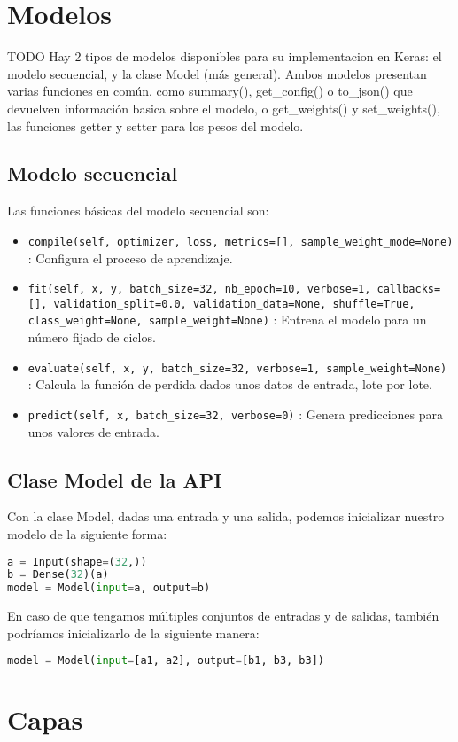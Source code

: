 \section{Modelos}
TODO
Hay 2 tipos de modelos disponibles para su implementacion en Keras: el modelo secuencial, y la clase Model (más general). Ambos modelos presentan varias funciones en común, como summary(), get\_config() o to\_json() que devuelven información basica sobre el modelo, o get\_weights() y set\_weights(), las funciones getter y setter para los pesos del modelo.
\subsection{Modelo secuencial}
Las funciones básicas del modelo secuencial son:
\begin{itemize}
\item \lstinline{compile(self, optimizer, loss, metrics=[], sample_weight_mode=None)} : Configura el proceso de aprendizaje.
\item \lstinline{fit(self, x, y, batch_size=32, nb_epoch=10, verbose=1, callbacks=[], validation_split=0.0, validation_data=None, shuffle=True, class_weight=None, sample_weight=None)} : Entrena el modelo para un número fijado de ciclos.
\item \lstinline{evaluate(self, x, y, batch_size=32, verbose=1, sample_weight=None)} : Calcula la función de perdida dados unos datos de entrada, lote por lote.
\item \lstinline{predict(self, x, batch_size=32, verbose=0)} : Genera predicciones para unos valores de entrada.
\end{itemize}
\subsection{Clase Model de la API}
Con la clase Model, dadas una entrada y una salida, podemos inicializar nuestro modelo de la siguiente forma:
\begin{lstlisting}[language=Python]
a = Input(shape=(32,))
b = Dense(32)(a)
model = Model(input=a, output=b)
\end{lstlisting}
En caso de que tengamos múltiples conjuntos de entradas y de salidas, también podríamos inicializarlo de la siguiente manera:
\begin{lstlisting}[language=Python]
model = Model(input=[a1, a2], output=[b1, b3, b3])
\end{lstlisting}
\section{Capas}
